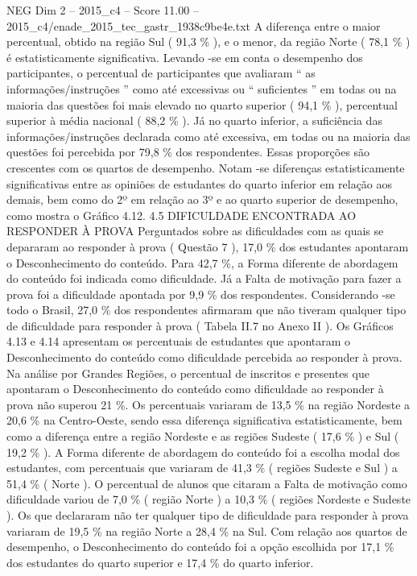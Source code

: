 \begin{textsample}{NEG Dim 2 – 2015\_c4 – Score 11.00 – 2015\_c4/enade\_2015\_tec\_gastr\_1938c9be4e.txt}
A diferença entre o maior percentual, obtido na região Sul ( 91,3 \% ), e o menor, da região Norte ( 78,1 \% ) é estatisticamente significativa.
Levando -se em conta o desempenho dos participantes, o percentual de participantes que avaliaram “ as informações/instruções ” como até excessivas ou “ suficientes ” em todas ou na maioria das questões foi mais elevado no quarto superior ( 94,1 \% ), percentual superior à média nacional ( 88,2 \% ).
Já no quarto inferior, a suficiência das informações/instruções declarada como até excessiva, em todas ou na maioria das questões foi percebida por 79,8 \% dos respondentes.
Essas proporções são crescentes com os quartos de desempenho.
Notam -se diferenças estatisticamente significativas entre as opiniões de estudantes do quarto inferior em relação aos demais, bem como do 2º em relação ao 3º e ao quarto superior de desempenho, como mostra o Gráfico 4.12. 4.5 DIFICULDADE ENCONTRADA AO RESPONDER À PROVA Perguntados sobre as dificuldades com as quais se depararam ao responder à prova ( Questão 7 ), 17,0 \% dos estudantes apontaram o Desconhecimento do conteúdo.
Para 42,7 \%, a Forma diferente de abordagem do conteúdo foi indicada como dificuldade.
Já a Falta de motivação para fazer a prova foi a dificuldade apontada por 9,9 \% dos respondentes.
Considerando -se todo o Brasil, 27,0 \% dos respondentes afirmaram que não tiveram qualquer tipo de dificuldade para responder à prova ( Tabela II.7 no Anexo II ).
Os Gráficos 4.13 e 4.14 apresentam os percentuais de estudantes que apontaram o Desconhecimento do conteúdo como dificuldade percebida ao responder à prova.
Na análise por Grandes Regiões, o percentual de inscritos e presentes que apontaram o Desconhecimento do conteúdo como dificuldade ao responder à prova não superou 21 \%.
Os percentuais variaram de 13,5 \% na região Nordeste a 20,6 \% na Centro-Oeste, sendo essa diferença significativa estatisticamente, bem como a diferença entre a região Nordeste e as regiões Sudeste ( 17,6 \% ) e Sul ( 19,2 \% ).
A Forma diferente de abordagem do conteúdo foi a escolha modal dos estudantes, com percentuais que variaram de 41,3 \% ( regiões Sudeste e Sul ) a 51,4 \% ( Norte ).
O percentual de alunos que citaram a Falta de motivação como dificuldade variou de 7,0 \% ( região Norte ) a 10,3 \% ( regiões Nordeste e Sudeste ).
Os que declararam não ter qualquer tipo de dificuldade para responder à prova variaram de 19,5 \% na região Norte a 28,4 \% na Sul.
Com relação aos quartos de desempenho, o Desconhecimento do conteúdo foi a opção escolhida por 17,1 \% dos estudantes do quarto superior e 17,4 \% do quarto inferior.

\end{textsample}
